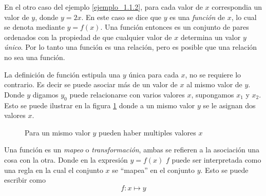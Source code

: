 En el otro caso del ejemplo \ref{ejemplo_1.1.2}, para cada valor de \(x\) correspondia un valor de \(y\), donde \(y = 2x\). En este caso se dice que \(y\) es una \textit{función} de \(x\), lo cual se denota mediante \(y = f(x)\). Una función entonces es un conjunto de pares ordenados con la propiedad de que cualquier valor de \(x\) determina un valor \(y\) \textit{único}. Por lo tanto una función es una relación, pero es posible que una relación no sea una función.

La definición de función estipula una \(y\) única para cada \(x\), no se requiere lo contrario. Es decir se puede asociar más de un valor de \(x\) al mismo valor de \(y\). Donde \(y\) digamos \(y_0\) puede relacionarse con varios valores \(x\), supongamos \(x_1\) y \(x_2\). Esto se puede ilustrar en la figura \ref{grafico_de_x_1_y_x_2} donde a un mismo valor \(y\) se le asignan dos valores \(x\).

\begin{figure}[!ht]
    \centering
    \caption{Para un mismo valor \(y\) pueden haber multiples valores \(x\)}
    \label{grafico_de_x_1_y_x_2}
\end{figure}

Una función es un \textit{mapeo} o \textit{transformación}, ambas se refieren a la asociación una cosa con la otra. Donde en la expresión \(y = f(x)\) \(f\) puede ser interpretada como una regla en la cual el conjunto \(x\) se ``mapea'' en el conjunto \(y\). Esto se puede escribir como 
\[
f:x \mapsto y
\]


